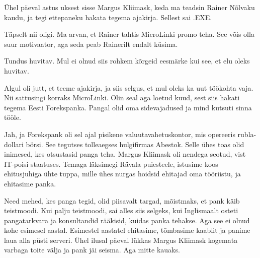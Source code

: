 
Ühel päeval astus uksest sisse Margus 
Kliimask, keda ma teadsin Rainer 
Nõlvaku kaudu, ja tegi ettepaneku hakata 
tegema ajakirja. Sellest sai .EXE.


Täpselt nii oligi. Ma arvan, et Rainer tahtis MicroLinki promo teha. 
See võis olla suur motivaator, aga seda peab Rainerilt endalt küsima.


Tundus huvitav. Mul ei olnud siis rohkem kõrgeid eesmärke kui see, et elu oleks 
huvitav.


Algul oli jutt, et teeme ajakirja, ja siis selgus, 
et mul oleks ka uut töökohta vaja. Nii sattusingi korraks MicroLinki. Olin seal aga loetud kuud, sest 
siis hakati tegema Eesti Forekspanka. Pangal olid oma sidevajadused ja mind kutsuti sinna tööle.


Jah, ja Forekspank oli sel ajal pisikene valuutavahetuskontor, mis opereeris 
rubla-dollari börsi.
See tegutses tolleaegses hulgifirmas Abestok. Selle ühes toas olid 
inimesed, kes otsustasid panga teha. Margus 
Kliimask oli nendega seotud, vist IT-poisi 
staatuses. Temaga läksimegi Rävala puiesteele, istusime koos 
ehitusjuhiga ühte tuppa, mille ühes nurgas hoidsid
ehitajad oma tööriistu, ja ehitasime panka.


Need mehed, kes panga tegid, olid piisavalt targad, mõistmaks, et pank käib 
teistmoodi. Kui palju teistmoodi, sai alles siis selgeks, kui 
Inglismaalt osteti pangatarkvara ja konsultandid rääkisid, kuidas panka 
tehakse. Aga see ei olnud kohe esimesel aastal. Esimestel aastatel ehitasime, 
tõmbasime kaablit ja panime laua alla püsti serveri. Ühel ilusal päeval lükkas
Margus Kliimask kogemata varbaga 
toite välja ja pank jäi seisma. Aga mitte kauaks. 

